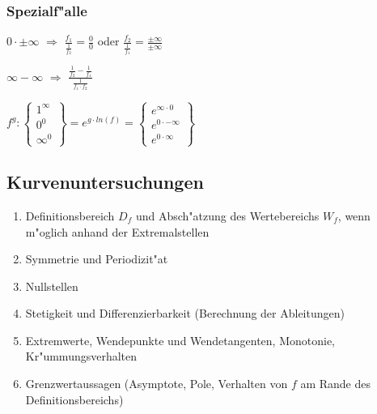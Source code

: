 \subsubsection{Spezialf"alle}
	\begin{minipage}[c]{7cm} 
		$0 \cdot \pm \infty$ $\Rightarrow$ $\frac{f_1}{\frac{1}{f_2}} = \frac{0}{0}$ oder $\frac{f_2}{\frac{1}{f_1}} = \frac{\pm \infty}{\pm \infty}$
	\end{minipage}
	\begin{minipage}[c]{4cm} 
		$\infty - \infty$ $\Rightarrow$ $\frac{\frac{1}{f_2} - \frac{1}{f_1}}{\frac{1}{f_1 \cdot f_2}} $
	\end{minipage}
	\begin{minipage}[c]{7cm} 
		$ f^g:
		\left\{ 	
			\begin{array}{l} 
				1^\infty \\ 
				0^0 \\ 
				\infty^0 
			\end{array} 
		\right\} =
	  e^{g \cdot ln(f)} =
		\left\{ 
			\begin{array}{l} 
				e^{\infty \cdot 0} \\ 
				e^{0 \cdot -\infty} \\ 
				e^{0 \cdot \infty}
			\end{array}
		\right\} $
	\end{minipage}	

\subsection{Kurvenuntersuchungen}
\begin{enumerate}
	\item Definitionsbereich $D_f$ und Absch"atzung des Wertebereichs $W_f$, wenn m"oglich anhand der Extremalstellen
	\item Symmetrie und Periodizit"at
	\item Nullstellen
	\item Stetigkeit und Differenzierbarkeit (Berechnung der Ableitungen)
	\item Extremwerte, Wendepunkte und Wendetangenten, Monotonie, Kr"ummungsverhalten
	\item Grenzwertaussagen (Asymptote, Pole, Verhalten von $f$ am Rande des Definitionsbereichs)
\end{enumerate}

